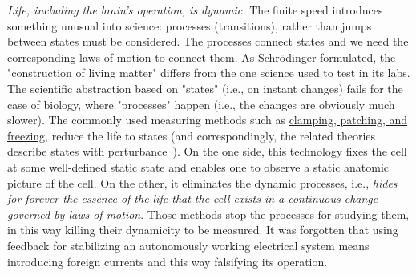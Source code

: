 {%
}

{
\textit{Life, including the brain's operation, is dynamic.} 
The finite speed introduces something unusual into science:
processes  (transitions), rather than jumps between states must be considered.
The processes connect states and we need the corresponding laws of motion to connect them. 
As Schrödinger formulated, the "construction of living matter" differs
from the one science used to test in its labs.
The scientific abstraction based on "states" (i.e., on instant changes)
fails for the case of biology, where "processes" happen (i.e., the changes
are obviously much slower).
 The commonly used measuring methods such as \hyperlink{voltage-clamping}{clamping, patching, and freezing},  reduce the life to states (and correspondingly, 
 the related theories describe states with perturbance~\cite{PerturbationNeuralComputation:2002}). 
On the one side, this technology fixes the cell at some well-defined static state and enables one to observe a static anatomic picture of the cell. On the other,
it eliminates the dynamic processes, i.e., \textit{hides for forever the essence of the life that the cell exists in a continuous change governed by laws of motion}.
Those methods stop the processes for studying them, in this way killing their dynamicity to be measured.
It was forgotten that using feedback for stabilizing an autonomously
working electrical system means introducing foreign currents
and this way falsifying its operation. 
}

